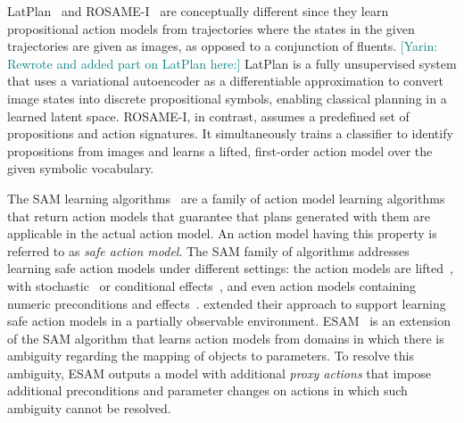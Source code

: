 \documentclass{article}
\theoremstyle{definition}
\theoremstyle{remark}
\newcommand{\sam}{\ac{SAM}\xspace}
\newcommand{\yarin}[1]{{\textcolor{teal}{[Yarin: #1]}}}
\begin{document}
LatPlan~\citep{asai2018classical} and ROSAME-I~\citep{xi2024neuro} are conceptually different since they learn propositional action models from trajectories where the states in the given trajectories are given as images, as opposed to a conjunction of fluents. 
\yarin{Rewrote and added part on LatPlan here:}
LatPlan is a fully unsupervised system that uses a variational autoencoder as a differentiable approximation to convert image states into discrete propositional symbols, enabling classical planning in a learned latent space.
ROSAME-I, in contrast, assumes a predefined set of propositions and action signatures. It simultaneously trains a classifier to identify propositions from images and learns a lifted, first-order action model over the given symbolic vocabulary.



The \sam learning algorithms~\citep{stern2017efficient,mordoch2023learning,juba2021safe,juba2022learning,le2024learning,mordoch2024safe} are a family of action model learning algorithms that return action models that guarantee that plans generated with them are applicable in the actual action model. 
An action model having this property is referred to as \emph{safe action model}.
The \sam family of algorithms addresses learning safe action models under different settings: 
the action models are lifted~\citep{juba2021safe}, with stochastic~\citep{juba2022learning} or conditional effects~\citep{mordoch2024safe}, and even action models containing numeric preconditions and effects~\citep{mordoch2023learning}.
\citet{le2024learning} extended their approach to support learning safe action models in a partially observable environment. 
ESAM~\citep{juba2021safe} is an extension of the \sam algorithm that learns action models from domains in which there is ambiguity regarding the mapping of objects to parameters. To resolve this ambiguity, ESAM outputs a model with additional \emph{proxy actions} that impose additional preconditions and parameter changes on actions in which such ambiguity cannot be resolved. 
\end{document}
